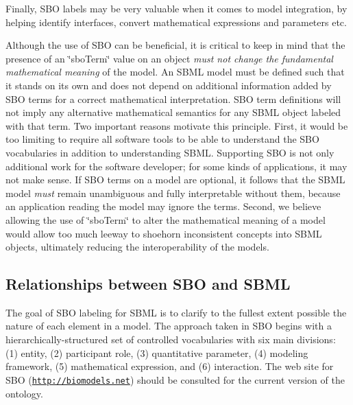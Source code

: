 Finally, S\+BO labels may be very valuable when it comes to model integration, by helping identify interfaces, convert mathematical expressions and parameters etc.

Although the use of S\+BO can be beneficial, it is critical to keep in mind that the presence of an \char`\"{}sbo\+Term\char`\"{} value on an object {\itshape must not change the fundamental mathematical meaning} of the model. An S\+B\+ML model must be defined such that it stands on its own and does not depend on additional information added by S\+BO terms for a correct mathematical interpretation. S\+BO term definitions will not imply any alternative mathematical semantics for any S\+B\+ML object labeled with that term. Two important reasons motivate this principle. First, it would be too limiting to require all software tools to be able to understand the S\+BO vocabularies in addition to understanding S\+B\+ML. Supporting S\+BO is not only additional work for the software developer; for some kinds of applications, it may not make sense. If S\+BO terms on a model are optional, it follows that the S\+B\+ML model {\itshape must} remain unambiguous and fully interpretable without them, because an application reading the model may ignore the terms. Second, we believe allowing the use of \char`\"{}sbo\+Term\char`\"{} to alter the mathematical meaning of a model would allow too much leeway to shoehorn inconsistent concepts into S\+B\+ML objects, ultimately reducing the interoperability of the models.\hypertarget{class_s_b_o_relationship}{}\subsection{Relationships between S\+B\+O and S\+B\+ML}\label{class_s_b_o_relationship}
The goal of S\+BO labeling for S\+B\+ML is to clarify to the fullest extent possible the nature of each element in a model. The approach taken in S\+BO begins with a hierarchically-\/structured set of controlled vocabularies with six main divisions\+: (1) entity, (2) participant role, (3) quantitative parameter, (4) modeling framework, (5) mathematical expression, and (6) interaction. The web site for S\+BO (\href{http://biomodels.net/sbo}{\tt http\+://biomodels.\+net}) should be consulted for the current version of the ontology.

